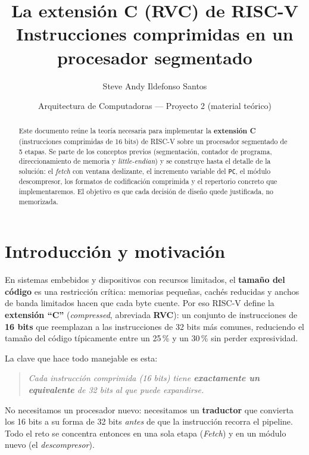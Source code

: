 \documentclass[11pt]{article}
\title{\vspace{-1.2cm}\textbf{La extensión C (RVC) de RISC-V}\\[2pt]
\large Instrucciones comprimidas en un procesador segmentado}
\author{Steve Andy Ildefonso Santos}
\date{Arquitectura de Computadoras --- Proyecto 2 (material teórico)}
\newcommand{\code}[1]{\texttt{#1}}
\begin{document}
\maketitle
\vspace{-0.7cm}

\begin{abstract}
\noindent
Este documento reúne la teoría necesaria para implementar la \textbf{extensión C}
(instrucciones comprimidas de 16 bits) de RISC-V sobre un procesador segmentado
de 5 etapas. Se parte de los conceptos previos (segmentación, contador de
programa, direccionamiento de memoria y \emph{little-endian}) y se construye hasta
el detalle de la solución: el \emph{fetch} con ventana deslizante, el incremento
variable del \code{PC}, el módulo descompresor, los formatos de codificación
comprimida y el repertorio concreto que implementaremos. El objetivo es que cada
decisión de diseño quede justificada, no memorizada.
\end{abstract}

\tableofcontents
\vspace{0.4cm}

\section{Introducción y motivación}

En sistemas embebidos y dispositivos con recursos limitados, el \textbf{tamaño
del código} es una restricción crítica: memorias pequeñas, cachés reducidas y
anchos de banda limitados hacen que cada byte cuente. Por eso RISC-V define la
\textbf{extensión ``C''} (\emph{compressed}, abreviada \textbf{RVC}): un conjunto
de instrucciones de \textbf{16 bits} que reemplazan a las instrucciones de 32
bits más comunes, reduciendo el tamaño del código típicamente entre un 25\,\% y un
30\,\% sin perder expresividad.

La clave que hace todo manejable es esta:
\begin{quote}
\itshape
Cada instrucción comprimida (16 bits) tiene \textbf{exactamente un equivalente}
de 32 bits al que puede expandirse.
\end{quote}
No necesitamos un procesador nuevo: necesitamos un \textbf{traductor} que
convierta los 16 bits a su forma de 32 bits \emph{antes} de que la instrucción
recorra el pipeline. Todo el reto se concentra entonces en una sola etapa
(\emph{Fetch}) y en un módulo nuevo (el \emph{descompresor}).
\end{document}
